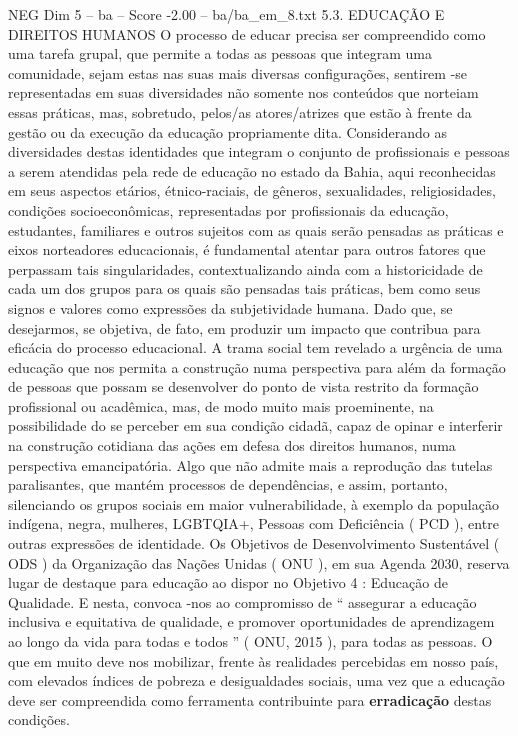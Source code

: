 \begin{textsample}{NEG Dim 5 – ba – Score -2.00 – ba/ba\_em\_8.txt}  \label{ex:f5_neg_015}
5.3.
EDUCAÇÃO E DIREITOS HUMANOS O processo de educar precisa ser compreendido como uma tarefa grupal, que permite a todas as pessoas que integram uma comunidade, sejam estas nas suas mais diversas configurações, sentirem -se representadas em suas diversidades não somente nos conteúdos que norteiam essas práticas, mas, sobretudo, pelos/as atores/atrizes que estão à frente da gestão ou da execução da educação propriamente dita.
Considerando as diversidades destas identidades que integram o conjunto de profissionais e pessoas a serem atendidas pela rede de educação no estado da Bahia, aqui reconhecidas em seus aspectos etários, étnico-raciais, de gêneros, sexualidades, religiosidades, condições socioeconômicas, representadas por profissionais da educação, estudantes, familiares e outros sujeitos com as quais serão pensadas as práticas e eixos norteadores educacionais, é fundamental atentar para outros fatores que perpassam tais singularidades, contextualizando ainda com a historicidade de cada um dos grupos para os quais são pensadas tais práticas, bem como seus signos e valores como expressões da subjetividade humana.
Dado que, se desejarmos, se objetiva, de fato, em produzir um impacto que contribua para eficácia do processo educacional.
A trama social tem revelado a urgência de uma educação que nos permita a construção numa perspectiva para além da formação de pessoas que possam se desenvolver do ponto de vista restrito da formação profissional ou acadêmica, mas, de modo muito mais proeminente, na possibilidade do se perceber em sua condição cidadã, capaz de opinar e interferir na construção cotidiana das ações em defesa dos direitos humanos, numa perspectiva emancipatória.
Algo que não admite mais a reprodução das tutelas paralisantes, que mantém processos de dependências, e assim, portanto, silenciando os grupos sociais em maior vulnerabilidade, à exemplo da população indígena, negra, mulheres, LGBTQIA+, Pessoas com Deficiência ( PCD ), entre outras expressões de identidade.
Os Objetivos de Desenvolvimento Sustentável ( ODS ) da Organização das Nações Unidas ( ONU ), em sua Agenda 2030, reserva lugar de destaque para educação ao dispor no Objetivo 4 : Educação de Qualidade.
E nesta, convoca -nos ao compromisso de “ assegurar a educação inclusiva e equitativa de qualidade, e promover oportunidades de aprendizagem ao longo da vida para todas e todos ” ( ONU, 2015 ), para todas as pessoas.
O que em muito deve nos mobilizar, frente às realidades percebidas em nosso país, com elevados índices de pobreza e desigualdades sociais, uma vez que a educação deve ser compreendida como ferramenta contribuinte para \textbf{erradicação} destas condições.

\end{textsample}
